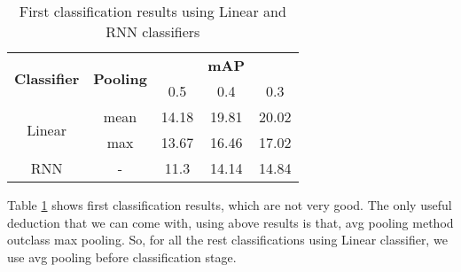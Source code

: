 \begin{table}[h]
  \centering
  \begin{tabular}{|| c | c || c  c  c ||}
    \hline
    \multirow{2}{*}{\textbf{Classifier}} & \multirow{2}{*}{\textbf{Pooling}} &  {} & \textbf{mAP} & {} \\
    {} & {} & 0.5 & 0.4 & 0.3 \\
    \hline
    \multirow{2}{*}{Linear} & mean & 14.18 & 19.81 & 20.02 \\
    \cline{2-5}
    {} & max & 13.67 & 16.46 & 17.02 \\
    \hline
    RNN  & -  & 11.3 & 14.14 & 14.84 \\
    \hline
  \end{tabular}
  \caption{First classification results using Linear and RNN classifiers}
  \label{table:rnn_linear}
\end{table}

  
Table \ref{table:rnn_linear} shows first classification results, which are not very good. The only useful deduction that we can come with, using above results is that, avg pooling
method outclass max pooling. So, for all the rest classifications using Linear classifier, we use avg pooling before classification
stage.


